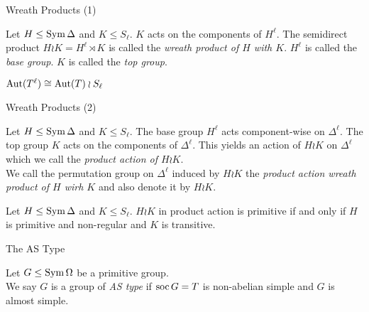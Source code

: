 \begin{frame}{Wreath Products (1)}
    \begin{defn}
        Let $H \leq \operatorname{Sym} \Delta$ and $K \leq S_\ell$.
        $K$ acts on the components of $H ^ \ell$.
        \pause
        The semidirect product
        $H \wr K = H ^ \ell \rtimes K$
        is called the \emph{wreath product of $H$ with $K$}.
        \pause
        $H ^ \ell$ is called the \emph{base group}.
        \pause
        $K$ is called the \emph{top group}.
    \end{defn}
    \vspace{1em}
    \pause

    \begin{thm}
        $\operatorname{Aut}( T ^ \ell ) \cong \operatorname{Aut}(T) \wr S_\ell$
    \end{thm}
\end{frame}


\begin{frame}{Wreath Products (2)}
    \begin{defn}
        Let $H \leq \operatorname{Sym} \Delta$ and $K \leq S_\ell$.
        The base group $H ^ \ell$ acts component-wise on $\Delta ^ \ell$.
        The top group $K$ acts on the components of $\Delta ^ \ell$.
        \pause
        This yields an action of $H \wr K$ on $\Delta ^ \ell$
        which we call the \emph{product action of $H \wr K$}.
        \\
        \pause
        We call the permutation group on $\Delta ^ \ell$ induced by $H \wr K$
        the \emph{product action wreath product of $H$ wirh $K$} and
        also denote it by $H \wr K$.
    \end{defn}
    \vspace{1em}
    \pause

    \begin{thm}
        Let $H \leq \operatorname{Sym} \Delta$ and $K \leq S_\ell$.
        $H \wr K$ in product action is primitive
        if and only if
        $H$ is primitive and non-regular and $K$ is transitive.
    \end{thm}
\end{frame}


\begin{frame}{The AS Type}
    \begin{defn}
        Let $G \leq \operatorname{Sym} \Omega$ be a primitive group.
        \\
        We say $G$ is a group of \emph{AS type} if
        $\operatorname{soc} G = T$ is non-abelian simple
        and $G$ is almost simple.
    \end{defn}
\end{frame}

